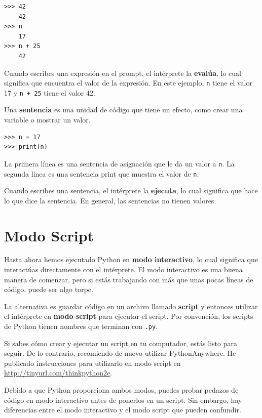 \documentclass[10pt]{book}
\begin{document}
\begin{verbatim}
>>> 42
    42
>>> n
    17
>>> n + 25
    42
\end{verbatim}
%
Cuando escribes una expresión en el prompt, el intérprete
la {\bf evalúa}, lo cual significa que encuentra el valor de
la expresión.
En este ejemplo, {\tt n} tiene el valor 17 y
{\tt n + 25} tiene el valor 42.

Una {\bf sentencia} es una unidad de código que tiene un efecto, como
crear una variable o mostrar un valor.

\begin{verbatim}
>>> n = 17
>>> print(n)
\end{verbatim}
%
La primera línea es una sentencia de asignación que le da un valor a
{\tt n}.  La segunda línea es una sentencia print que muestra el
valor de {\tt n}.

Cuando escribes una sentencia, el intérprete la {\bf ejecuta},
lo cual significa que hace lo que dice la sentencia.  En general,
las sentencias no tienen valores.


\section{Modo Script}

Hasta ahora hemos ejecutado Python en {\bf modo interactivo}, lo cual
significa que interactúas directamente con el intérprete.
El modo interactivo es una buena manera de comenzar,
pero si estás trabajando con más que unas pocas líneas de código, puede ser
algo torpe.

La alternativa es guardar código en un archivo llamado {\bf script} y
entonces utilizar el intérprete en {\bf modo script} para ejecutar el script.  Por
convención, los scripts de Python tienen nombres que terminan con {\tt .py}.

Si sabes cómo crear y ejecutar un script en tu computador, estás
listo para seguir.  De lo contrario, recomiendo de nuevo utilizar PythonAnywhere.
He publicado instrucciones para utilizarlo en modo script en
\url{http://tinyurl.com/thinkpython2e}.

Debido a que Python proporciona ambos modos,
puedes probar pedazos de código en modo interactivo antes de ponerlos
en un script.  Sin embargo, hay diferencias entre el modo interactivo
y el modo script que pueden confundir.
\end{document}

